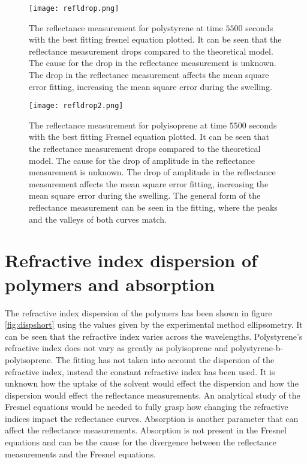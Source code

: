 \documentclass[MasterThesisMain.tex]{subfiles}
\begin{document}
\begin{figure}[H]
\centering
\texttt{[image: refldrop.png]}
\caption{The reflectance measurement for polystyrene at time $5500$ seconds with the best fitting fresnel equation plotted. It can be seen that the reflectance measurement drops compared to the theoretical model. The cause for the drop in the reflectance measurement is unknown. The drop in the reflectance measurement affects the mean square error fitting, increasing the mean square error during the swelling.}
\label{fig:drop}
\end{figure}

\begin{figure}[H]
\centering
\texttt{[image: refldrop2.png]}
\caption{The reflectance measurement for polyisoprene at time $5500$ seconds with the best fitting Fresnel equation plotted. It can be seen that the reflectance measurement drops compared to the theoretical model. The cause for the drop of amplitude in the reflectance measurement is unknown. The drop of amplitude in the reflectance measurement affects the mean square error fitting, increasing the mean square error during the swelling. The general form of the reflectance measurement can be seen in the fitting, where the peaks and the valleys of both curves match.}
\label{fig:drop2}
\end{figure}

\section{Refractive index dispersion of polymers and absorption}
The refractive index dispersion of the polymers has been shown in figure \ref{fig:dispshort} using the values given by the experimental method ellipsometry. It can be seen that the refractive index varies across the wavelengths. Polystyrene's refractive index does not vary as greatly as polyisoprene and polystyrene-b-polyisoprene. The fitting has not taken into account the dispersion of the refractive index, instead the constant refractive index has been used. It is unknown how the uptake of the solvent would effect the dispersion and how the dispersion would effect the reflectance measurements. An analytical study of the Fresnel equations would be needed to fully grasp how changing the refractive indices impact the reflectance curves. Absorption is another parameter that can affect the reflectance measurements. Absorption is not present in the Fresnel equations and can be the cause for the divergence between the reflectance measurements and the Fresnel equations. 
\end{document}
